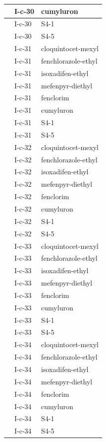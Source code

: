 \documentclass[11pt,a4paper]{article}
\begin{document}
\begin{table}[h]
\begin{tabular}{|l|l|l|}
 & I-c-30 & cumyluron \\ \hline
 & I-c-30 & S4-1 \\ \hline
 & I-c-30 & S4-5 \\ \hline
 & I-c-31 & cloquintocet-mexyl \\ \hline
 & I-c-31 & fenchlorazole-ethyl \\ \hline
 & I-c-31 & isoxadifen-ethyl \\ \hline
 & I-c-31 & mefenpyr-diethyl \\ \hline
 & I-c-31 & fenclorim \\ \hline
 & I-c-31 & cumyluron \\ \hline
 & I-c-31 & S4-1 \\ \hline
 & I-c-31 & S4-5 \\ \hline
 & I-c-32 & cloquintocet-mexyl \\ \hline
 & I-c-32 & fenchlorazole-ethyl \\ \hline
 & I-c-32 & isoxadifen-ethyl \\ \hline
 & I-c-32 & mefenpyr-diethyl \\ \hline
 & I-c-32 & fenclorim \\ \hline
 & I-c-32 & cumyluron \\ \hline
 & I-c-32 & S4-1 \\ \hline
 & I-c-32 & S4-5 \\ \hline
 & I-c-33 & cloquintocet-mexyl \\ \hline
 & I-c-33 & fenchlorazole-ethyl \\ \hline
 & I-c-33 & isoxadifen-ethyl \\ \hline
 & I-c-33 & mefenpyr-diethyl \\ \hline
 & I-c-33 & fenclorim \\ \hline
 & I-c-33 & cumyluron \\ \hline
 & I-c-33 & S4-1 \\ \hline
 & I-c-33 & S4-5 \\ \hline
 & I-c-34 & cloquintocet-mexyl \\ \hline
 & I-c-34 & fenchlorazole-ethyl \\ \hline
 & I-c-34 & isoxadifen-ethyl \\ \hline
 & I-c-34 & mefenpyr-diethyl \\ \hline
 & I-c-34 & fenclorim \\ \hline
 & I-c-34 & cumyluron \\ \hline
 & I-c-34 & S4-1 \\ \hline
 & I-c-34 & S4-5 \\ \hline

\end{tabular}
\end{table}
\end{document}
